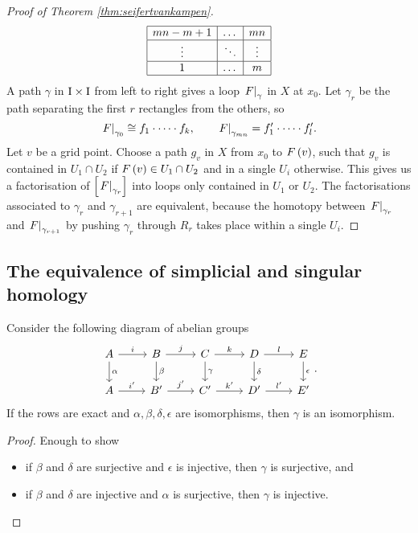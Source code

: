 \begin{proof}[Proof of Theorem \ref{thm:seifertvankampen}]
$$\begin{array}{|c|c|c|}
\hline
mn - m + 1 & \dots & mn \\
\hline
\vdots & \ddots & \vdots \\
\hline
1 & \dots & m \\
\hline
\end{array}
$$
A path $ \gamma $ in $ \mathrm{I} \times \mathrm{I} $ from left to right gives a loop $ \left. F \right|_\gamma $ in $ X $ at $ x_0 $. Let $ \gamma_r $ be the path separating the first $ r $ rectangles from the others, so
$$ \left. F \right|_{\gamma_0} \cong f_1 \cdot \dots \cdot f_k, \qquad \left. F \right|_{\gamma_{mn}} = f_1' \cdot \dots \cdot f_l'. $$
Let $ v $ be a grid point. Choose a path $ g_v $ in $ X $ from $ x_0 $ to $ F\br{v} $, such that $ g_v $ is contained in $ U_1 \cap U_2 $ if $ F\br{v} \in U_1 \cap U_2 $ and in a single $ U_i $ otherwise. This gives us a factorisation of $ \sbr{\eval{F}_{\gamma_r}} $ into loops only contained in $ U_1 $ or $ U_2 $. The factorisations associated to $ \gamma_r $ and $ \gamma_{r + 1} $ are equivalent, because the homotopy between $ \left. F \right|_{\gamma_r} $ and $ \left. F \right|_{\gamma_{r + 1}} $ by pushing $ \gamma_r $ through $ R_r $ takes place within a single $ U_i $.
\end{proof}

\pagebreak

\subsection{The equivalence of simplicial and singular homology}

\begin{lemma}
Consider the following diagram of abelian groups
$$
\begin{tikzcd}
A \arrow{r}{i} \arrow{d}{\alpha} & B \arrow{r}{j} \arrow{d}{\beta} & C \arrow{r}{k} \arrow{d}{\gamma} & D \arrow{r}{l} \arrow{d}{\delta} & E \arrow{d}{\epsilon} \\
A \arrow{r}{i'} & B' \arrow{r}{j'} & C' \arrow{r}{k'} & D' \arrow{r}{l'} & E'
\end{tikzcd}.
$$
If the rows are exact and $ \alpha, \beta, \delta, \epsilon $ are isomorphisms, then $ \gamma $ is an isomorphism.
\end{lemma}

\begin{proof}
Enough to show
\begin{itemize}
\item if $ \beta $ and $ \delta $ are surjective and $ \epsilon $ is injective, then $ \gamma $ is surjective, and
\item if $ \beta $ and $ \delta $ are injective and $ \alpha $ is surjective, then $ \gamma $ is injective.
\end{itemize}
\end{proof}

